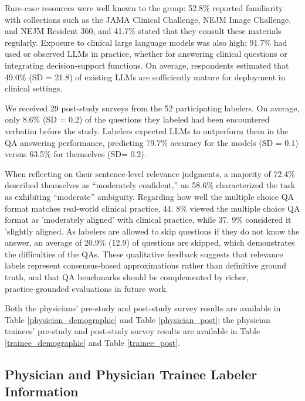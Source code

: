 \documentclass[11pt]{article}
\begin{document}
Rare‑case resources were well known to the group: 52.8\% reported familiarity with collections such as the JAMA Clinical Challenge, NEJM Image Challenge, and NEJM Resident 360, and 41.7\% stated that they consult these materials regularly. Exposure to clinical large language models was also high: 91.7\% had used or observed LLMs in practice, whether for answering clinical questions or integrating decision‑support functions. On average, respondents estimated that 49.0\% (SD = 21.8) of existing LLMs are sufficiently mature for deployment in clinical settings.

We received 29 post-study surveys from the 52 participating labelers. On average, only 8.6\% (SD = 0.2) of the questions they labeled had been encountered verbatim before the study. Labelers expected LLMs to outperform them in the QA answering performance, predicting 79.7\% accuracy for the models (SD = 0.1) versus 63.5\% for themselves (SD= 0.2). 

When reflecting on their sentence‑level relevance judgments, a majority of 72.4\% described themselves as “moderately confident,” an 58.6\% characterized the task as exhibiting “moderate” ambiguity. Regarding how well the multiple choice QA format matches real-world clinical practice, 44. 8\% viewed the multiple choice QA format as 'moderately aligned' with clinical practice, while 37. 9\% considered it 'slightly aligned. As labelers are allowed to skip questions if they do not know the answer, an average of 20.9\% (12.9) of questions are skipped, which demonstrates the difficulties of the QAs. These qualitative feedback suggests that relevance labels represent consensus‑based approximations rather than definitive ground truth, and that QA benchmarks should be complemented by richer, practice‑grounded evaluations in future work.

Both the physicians' pre-study and post-study survey results are available in Table \ref{physician_demographic} and Table \ref{physician_post}; the physician trainees' pre-study and post-study survey results are available in Table \ref{trainee_demographic} and Table \ref{trainee_post}. 

\subsection{Physician and Physician Trainee Labeler Information}
\end{document}

